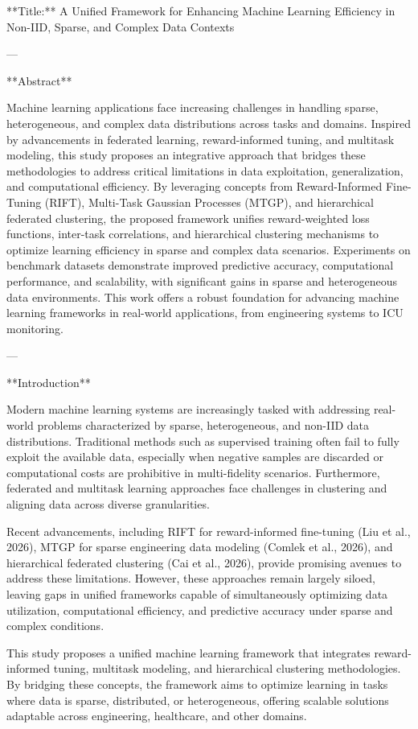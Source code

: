 **Title:** A Unified Framework for Enhancing Machine Learning Efficiency in Non-IID, Sparse, and Complex Data Contexts

---

**Abstract**

Machine learning applications face increasing challenges in handling sparse, heterogeneous, and complex data distributions across tasks and domains. Inspired by advancements in federated learning, reward-informed tuning, and multitask modeling, this study proposes an integrative approach that bridges these methodologies to address critical limitations in data exploitation, generalization, and computational efficiency. By leveraging concepts from Reward-Informed Fine-Tuning (RIFT), Multi-Task Gaussian Processes (MTGP), and hierarchical federated clustering, the proposed framework unifies reward-weighted loss functions, inter-task correlations, and hierarchical clustering mechanisms to optimize learning efficiency in sparse and complex data scenarios. Experiments on benchmark datasets demonstrate improved predictive accuracy, computational performance, and scalability, with significant gains in sparse and heterogeneous data environments. This work offers a robust foundation for advancing machine learning frameworks in real-world applications, from engineering systems to ICU monitoring.

---

**Introduction**

Modern machine learning systems are increasingly tasked with addressing real-world problems characterized by sparse, heterogeneous, and non-IID data distributions. Traditional methods such as supervised training often fail to fully exploit the available data, especially when negative samples are discarded or computational costs are prohibitive in multi-fidelity scenarios. Furthermore, federated and multitask learning approaches face challenges in clustering and aligning data across diverse granularities.

Recent advancements, including RIFT for reward-informed fine-tuning (Liu et al., 2026), MTGP for sparse engineering data modeling (Comlek et al., 2026), and hierarchical federated clustering (Cai et al., 2026), provide promising avenues to address these limitations. However, these approaches remain largely siloed, leaving gaps in unified frameworks capable of simultaneously optimizing data utilization, computational efficiency, and predictive accuracy under sparse and complex conditions.

This study proposes a unified machine learning framework that integrates reward-informed tuning, multitask modeling, and hierarchical clustering methodologies. By bridging these concepts, the framework aims to optimize learning in tasks where data is sparse, distributed, or heterogeneous, offering scalable solutions adaptable across engineering, healthcare, and other domains.

